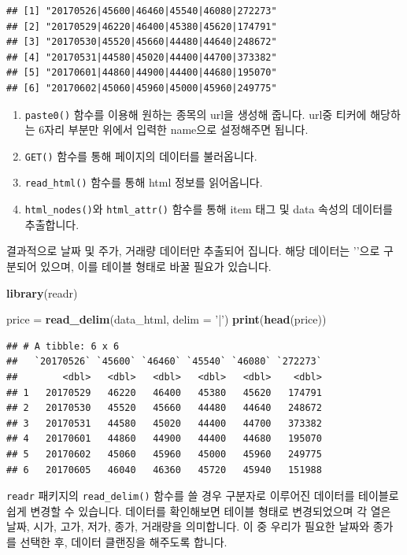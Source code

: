 \documentclass[]{book}
\newenvironment{Shaded}{\begin{snugshade}}{\end{snugshade}}
\newcommand{\DataTypeTok}[1]{\textcolor[rgb]{0.13,0.29,0.53}{#1}}
\newcommand{\KeywordTok}[1]{\textcolor[rgb]{0.13,0.29,0.53}{\textbf{#1}}}
\newcommand{\NormalTok}[1]{#1}
\newcommand{\StringTok}[1]{\textcolor[rgb]{0.31,0.60,0.02}{#1}}
\providecommand{\tightlist}{%
  \setlength{\itemsep}{0pt}\setlength{\parskip}{0pt}}
\begin{document}
\begin{verbatim}
## [1] "20170526|45600|46460|45540|46080|272273"
## [2] "20170529|46220|46400|45380|45620|174791"
## [3] "20170530|45520|45660|44480|44640|248672"
## [4] "20170531|44580|45020|44400|44700|373382"
## [5] "20170601|44860|44900|44400|44680|195070"
## [6] "20170602|45060|45960|45000|45960|249775"
\end{verbatim}

\begin{enumerate}
\def\labelenumi{\arabic{enumi}.}
\tightlist
\item
  \texttt{paste0()} 함수를 이용해 원하는 종목의 url을 생성해 줍니다. url중 티커에 해당하는 6자리 부분만 위에서 입력한 name으로 설정해주면 됩니다.
\item
  \texttt{GET()} 함수를 통해 페이지의 데이터를 불러옵니다.
\item
  \texttt{read\_html()} 함수를 통해 html 정보를 읽어옵니다.
\item
  \texttt{html\_nodes()}와 \texttt{html\_attr()} 함수를 통해 item 태그 및 data 속성의 데이터를 추출합니다.
\end{enumerate}

결과적으로 날짜 및 주가, 거래량 데이터만 추출되어 집니다. 해당 데이터는 '\textbar{}'으로 구분되어 있으며, 이를 테이블 형태로 바꿀 필요가 있습니다.

\begin{Shaded}
\begin{Highlighting}[]
\KeywordTok{library}\NormalTok{(readr)}

\NormalTok{price =}\StringTok{ }\KeywordTok{read_delim}\NormalTok{(data_html, }\DataTypeTok{delim =} \StringTok{'|'}\NormalTok{)}
\KeywordTok{print}\NormalTok{(}\KeywordTok{head}\NormalTok{(price))}
\end{Highlighting}
\end{Shaded}

\begin{verbatim}
## # A tibble: 6 x 6
##   `20170526` `45600` `46460` `45540` `46080` `272273`
##        <dbl>   <dbl>   <dbl>   <dbl>   <dbl>    <dbl>
## 1   20170529   46220   46400   45380   45620   174791
## 2   20170530   45520   45660   44480   44640   248672
## 3   20170531   44580   45020   44400   44700   373382
## 4   20170601   44860   44900   44400   44680   195070
## 5   20170602   45060   45960   45000   45960   249775
## 6   20170605   46040   46360   45720   45940   151988
\end{verbatim}

\texttt{readr} 패키지의 \texttt{read\_delim()} 함수를 쓸 경우 구분자로 이루어진 데이터를 테이블로 쉽게 변경할 수 있습니다. 데이터를 확인해보면 테이블 형태로 변경되었으며 각 열은 날짜, 시가, 고가, 저가, 종가, 거래량을 의미합니다. 이 중 우리가 필요한 날짜와 종가를 선택한 후, 데이터 클랜징을 해주도록 합니다.
\end{document}
